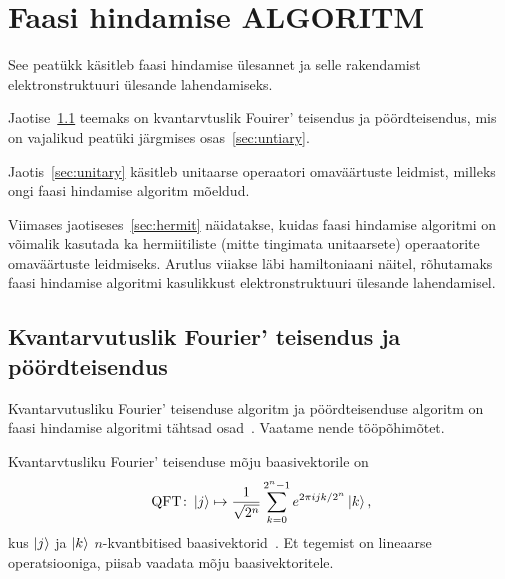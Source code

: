 \documentclass[12pt]{report}
\def\ket#1{\mathinner{|#1\rangle}}
\def\QFT{\mathop{\mathrm{QFT}}\nolimits}
\begin{document}
\section{Faasi hindamise ALGORITM}

See peatükk käsitleb faasi hindamise ülesannet ja selle rakendamist elektronstruktuuri ülesande lahendamiseks.

Jaotise~\ref{sec:qft} teemaks on kvantarvtuslik Fouirer' teisendus ja pöördteisendus, mis on vajalikud peatüki järgmises osas~\ref{sec:untiary}.

Jaotis~\ref{sec:unitary} käsitleb unitaarse operaatori omaväärtuste leidmist, milleks ongi faasi hindamise algoritm mõeldud.

Viimases jaotiseses~\ref{sec:hermit} näidatakse, kuidas faasi hindamise algoritmi on võimalik kasutada ka hermiitiliste (mitte tingimata unitaarsete) operaatorite omaväärtuste leidmiseks.
Arutlus viiakse läbi hamiltoniaani näitel, rõhutamaks faasi hindamise algoritmi kasulikkust elektronstruktuuri ülesande lahendamisel.


\subsection{Kvantarvutuslik Fourier' teisendus ja pöördteisendus}\label{sec:qft}

Kvantarvutusliku Fourier' teisenduse algoritm ja pöördteisenduse algoritm on faasi hindamise algoritmi tähtsad osad~\cite{nielsen+chuang, kaye+laflamme+mosca}.
Vaatame nende tööpõhimõtet.

Kvantarvtusliku Fourier' teisenduse mõju baasivektorile on
\begin{align}\label{f:qftdef}
    \QFT\colon
    \ket{j} \mapsto \frac{1}{\sqrt{2^n}} \sum_{k=0}^{2^n-1} e^{2\pi ijk/2^n} \ket{k} \rlap{,}
\end{align}
kus \(\ket{j}\) ja \(\ket{k}\) \(n\)-kvantbitised
baasivektorid~\cite{nielsen+chuang, kaye+laflamme+mosca}. Et tegemist on
lineaarse operatsiooniga, piisab vaadata mõju baasivektoritele.
\end{document}
